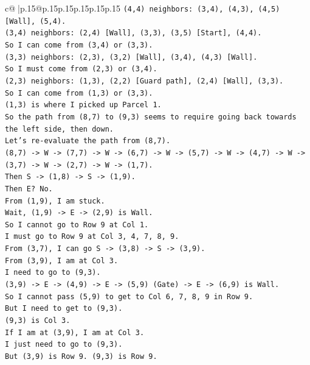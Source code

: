 \documentclass{article}
\begin{document}
{\begin{supertabular}{c@{$\;$}|p{.15\linewidth}@{}p{.15\linewidth}p{.15\linewidth}p{.15\linewidth}p{.15\linewidth}p{.15\linewidth}}
{{{\texttt{(4,4) neighbors: (3,4), (4,3), (4,5) {[}Wall{]}, (5,4).} \\
\texttt{(3,4) neighbors: (2,4) {[}Wall{]}, (3,3), (3,5) {[}Start{]}, (4,4).} \\
\texttt{So I can come from (3,4) or (3,3).} \\
\texttt{(3,3) neighbors: (2,3), (3,2) {[}Wall{]}, (3,4), (4,3) {[}Wall{]}.} \\
\texttt{So I must come from (2,3) or (3,4).} \\
\texttt{(2,3) neighbors: (1,3), (2,2) {[}Guard path{]}, (2,4) {[}Wall{]}, (3,3).} \\
\texttt{So I can come from (1,3) or (3,3).} \\
\texttt{(1,3) is where I picked up Parcel 1.} \\
\texttt{So the path from (8,7) to (9,3) seems to require going back towards the left side, then down.} \\
\texttt{Let's re{-}evaluate the path from (8,7).} \\
\texttt{(8,7) {-}> W {-}> (7,7) {-}> W {-}> (6,7) {-}> W {-}> (5,7) {-}> W {-}> (4,7) {-}> W {-}> (3,7) {-}> W {-}> (2,7) {-}> W {-}> (1,7).} \\
\texttt{Then S {-}> (1,8) {-}> S {-}> (1,9).} \\
\texttt{Then E? No.} \\
\texttt{From (1,9), I am stuck.} \\
\texttt{Wait, (1,9) {-}> E {-}> (2,9) is Wall.} \\
\texttt{So I cannot go to Row 9 at Col 1.} \\
\texttt{I must go to Row 9 at Col 3, 4, 7, 8, 9.} \\
\texttt{From (3,7), I can go S {-}> (3,8) {-}> S {-}> (3,9).} \\
\texttt{From (3,9), I am at Col 3.} \\
\texttt{I need to go to (9,3).} \\
\texttt{(3,9) {-}> E {-}> (4,9) {-}> E {-}> (5,9) (Gate) {-}> E {-}> (6,9) is Wall.} \\
\texttt{So I cannot pass (5,9) to get to Col 6, 7, 8, 9 in Row 9.} \\
\texttt{But I need to get to (9,3).} \\
\texttt{(9,3) is Col 3.} \\
\texttt{If I am at (3,9), I am at Col 3.} \\
\texttt{I just need to go to (9,3).} \\
\texttt{But (3,9) is Row 9. (9,3) is Row 9.} \\
}}}
\end{supertabular}}
\end{document}
